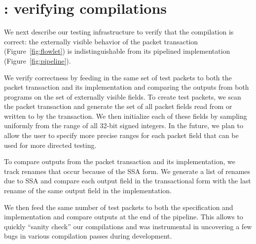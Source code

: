 \section{\tester: verifying compilations}
\label{s:jayhawk}
We next describe our testing infrastructure to verify that the compilation is
correct: the externally visible behavior of the packet transaction
(Figure~\ref{fig:flowlet}) is indistinguishable from its pipelined
implementation (Figure~\ref{fig:pipeline}).

We verify correctness by feeding in the same set of test packets to both the
packet transaction and its implementation and comparing the outputs from both
programs on the set of externally visible fields. To create test packets, we
scan the packet transaction and generate the set of all packet fields read from
or written to by the transaction. We then initialize each of these fields by
sampling uniformly from the range of all 32-bit signed integers. In the future,
we plan to allow the user to specify more precise ranges for each packet field
that can be used for more directed testing.

To compare outputs from the packet transaction and its implementation, we track
renames that occur because of the SSA form. We generate a list of renames due
to SSA and compare each output field in the transactional form with the last
rename of the same output field in the implementation.

We then feed the same number of test packets to both the specification and
implementation and compare outputs at the end of the pipeline. This allows to
quickly ``sanity check'' our compilations and was instrumental in uncovering a
few bugs in various compilation passes during development.
